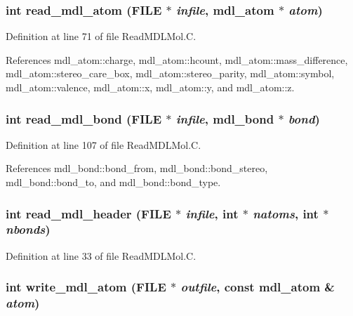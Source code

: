 \subsubsection{\setlength{\rightskip}{0pt plus 5cm}int read\_\-mdl\_\-atom (FILE $\ast$ {\em infile}, {\bf mdl\_\-atom} $\ast$ {\em atom})}\label{ReadMDLMol_8C_a2}




Definition at line 71 of file Read\-MDLMol.C.

References mdl\_\-atom::charge, mdl\_\-atom::hcount, mdl\_\-atom::mass\_\-difference, mdl\_\-atom::stereo\_\-care\_\-box, mdl\_\-atom::stereo\_\-parity, mdl\_\-atom::symbol, mdl\_\-atom::valence, mdl\_\-atom::x, mdl\_\-atom::y, and mdl\_\-atom::z.
\subsubsection{\setlength{\rightskip}{0pt plus 5cm}int read\_\-mdl\_\-bond (FILE $\ast$ {\em infile}, {\bf mdl\_\-bond} $\ast$ {\em bond})}\label{ReadMDLMol_8C_a3}




Definition at line 107 of file Read\-MDLMol.C.

References mdl\_\-bond::bond\_\-from, mdl\_\-bond::bond\_\-stereo, mdl\_\-bond::bond\_\-to, and mdl\_\-bond::bond\_\-type.
\subsubsection{\setlength{\rightskip}{0pt plus 5cm}int read\_\-mdl\_\-header (FILE $\ast$ {\em infile}, int $\ast$ {\em natoms}, int $\ast$ {\em nbonds})}\label{ReadMDLMol_8C_a0}




Definition at line 33 of file Read\-MDLMol.C.
\subsubsection{\setlength{\rightskip}{0pt plus 5cm}int write\_\-mdl\_\-atom (FILE $\ast$ {\em outfile}, const {\bf mdl\_\-atom} \& {\em atom})}\label{ReadMDLMol_8C_a1}




